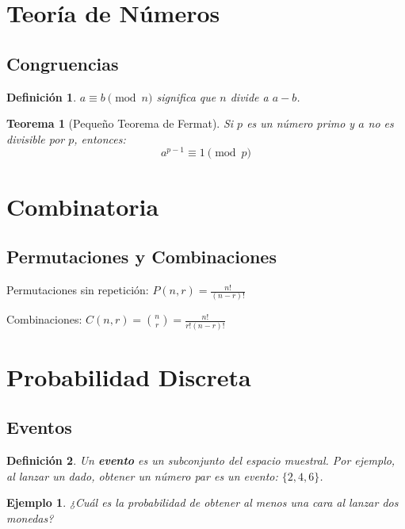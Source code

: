 \documentclass[11pt]{article}
\newtheorem{definition}{Definición}[section]
\newtheorem{theorem}{Teorema}[section]
\newtheorem{example}{Ejemplo}[section]
\begin{document}
\section{Teoría de Números}
\subsection{Congruencias}
\begin{definition}
$a \equiv b \pmod{n}$ significa que $n$ divide a $a - b$.
\end{definition}

\begin{theorem}[Pequeño Teorema de Fermat]
Si $p$ es un número primo y $a$ no es divisible por $p$, entonces:
\[
a^{p-1} \equiv 1 \pmod{p}
\]
\end{theorem}

\section{Combinatoria}
\subsection{Permutaciones y Combinaciones}
\begin{keyformula}
Permutaciones sin repetición: $P(n, r) = \frac{n!}{(n - r)!}$
\end{keyformula}

\begin{keyformula}
Combinaciones: $C(n, r) = \binom{n}{r} = \frac{n!}{r!(n - r)!}$
\end{keyformula}

\section{Probabilidad Discreta}
\subsection{Eventos}
\begin{definition}
Un \textbf{evento} es un subconjunto del espacio muestral. Por ejemplo, al lanzar un dado, obtener un número par es un evento: $\{2, 4, 6\}$.
\end{definition}

\begin{example}
¿Cuál es la probabilidad de obtener al menos una cara al lanzar dos monedas?
\end{example}
\end{document}
